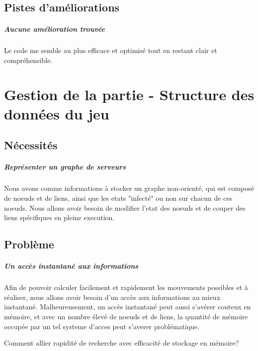 \documentclass{scrreprt}
\begin{document}
    \section{Pistes d'améliorations}

    \paragraph{Aucune amélioration trouvée}
    Le code me semble au plus efficace et optimisé tout en restant clair et
    compréhensible.



    \chapter{Gestion de la partie - Structure des données du jeu}

    \section{Nécessités}

    \paragraph{Représenter un graphe de serveurs}
    Nous avons comme informations à stocker un graphe non-orienté, qui est
    composé de noeuds et de liens, ainsi que les etats "infecté" ou non sur
    chacun de ces noeuds.
    Nous allons avoir besoin de modifier l'etat des noeuds et de couper des
    liens spécifiques en pleine execution.

    \section{Problème}

    \paragraph{Un accès instantané aux informations}
    Afin de pouvoir calculer facilement et rapidement les mouvements
    possibles et à réaliser, nous allons avoir besoin d'un accès aux
    informations au mieux instantané.
    Malheureusement, un accès instantané peut aussi s'avérer couteux en
    mémoire, et avec un nombre élevé de noeuds et de liens, la quantité de
    mémoire occupée par un tel systeme d'acces peut s'averer problématique.

    \begin{problem}
        Comment allier rapidité de recherche avec efficacité de stockage en mémoire?
    \end{problem}
\end{document}
